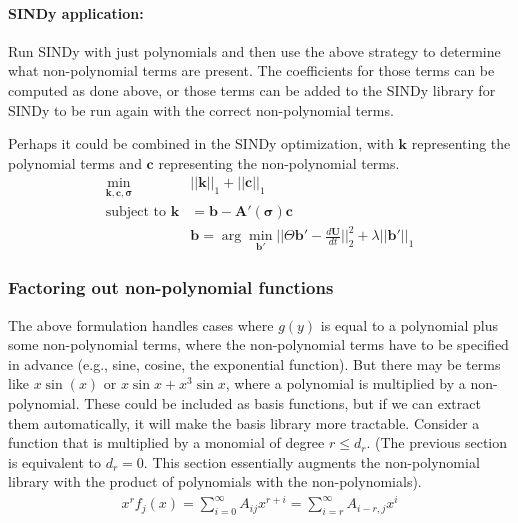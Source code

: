 \documentclass{article}
\let\vec\mathbf
\begin{document}
\paragraph{SINDy application:} Run SINDy with just polynomials and then use the
above strategy to determine what non-polynomial terms are present. The
coefficients for those terms can be computed as done above, or those terms can
be added to the SINDy library for SINDy to be run again with the correct
non-polynomial terms.

Perhaps it could be combined in the SINDy optimization, with $\vec{k}$
representing the polynomial terms and $\vec{c}$ representing the non-polynomial
terms.
\begin{align*}
\min_{\vec{k},\vec{c},\vec{\sigma}} & ||\vec{k}||_1 + ||\vec{c}||_1
\\\text{subject to } \vec{k} &=  \vec{b} - \vec{A}'(\vec{\sigma})\vec{c}
\\ & \vec{b} = \arg \min_{\vec{b}'} ||\Theta \vec{b}' - \tfrac{d\vec{U}}{dt}||_2^2 + \lambda ||\vec{b}'||_1
\end{align*}


\subsubsection{Factoring out non-polynomial functions}

The above formulation handles cases where $g(y)$ is equal to a polynomial plus
some non-polynomial terms, where the non-polynomial terms have to be specified
in advance (e.g., sine, cosine, the exponential function). But there may be
terms like $x \sin(x)$ or $x\sin x + x^3\sin x$, where a polynomial is
multiplied by a non-polynomial. These could be included as basis functions, but
if we can extract them automatically, it will make the basis library more
tractable. Consider a function that is multiplied by a monomial of degree $r \le
d_r$. (The previous section is equivalent to $d_r=0$. This section essentially
augments the non-polynomial library with the product of polynomials with the
non-polynomials).
\begin{align*}
x^r f_j(x) = \sum_{i=0}^\infty A_{ij} x^{r+i} = \sum_{i=r}^\infty A_{i-r,j} x^{i}
\end{align*}
\end{document}
